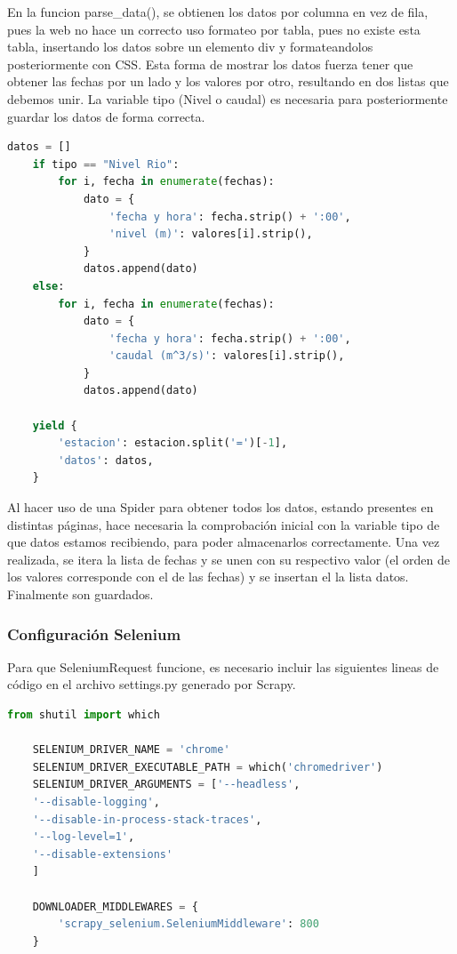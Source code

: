 En la funcion parse\_data(), se obtienen los datos por columna en vez de fila, pues la web no hace un correcto uso formateo por tabla, pues no existe esta tabla, insertando los datos sobre un elemento div y formateandolos posteriormente con CSS. Esta forma de mostrar los datos fuerza tener que obtener las fechas por un lado y los valores por otro, resultando en dos listas que debemos unir. La variable tipo (Nivel o caudal) es necesaria para posteriormente guardar los datos de forma correcta.

\begin{lstlisting}[language=Python, caption={Selector en parse\_data() de Agua en Navarra Data Spider}]
	datos = []
	if tipo == "Nivel Rio":
		for i, fecha in enumerate(fechas):
			dato = {
				'fecha y hora': fecha.strip() + ':00',
				'nivel (m)': valores[i].strip(),
			}
			datos.append(dato)
	else:
		for i, fecha in enumerate(fechas):
			dato = {
				'fecha y hora': fecha.strip() + ':00',
				'caudal (m^3/s)': valores[i].strip(),
			}
			datos.append(dato)
	
	yield {
		'estacion': estacion.split('=')[-1],
		'datos': datos,
	}
\end{lstlisting}

Al hacer uso de una Spider para obtener todos los datos, estando presentes en distintas páginas, hace necesaria la comprobación inicial con la variable tipo de que datos estamos recibiendo, para poder almacenarlos correctamente. Una vez realizada, se itera la lista de fechas y se unen con su respectivo valor (el orden de los valores corresponde con el de las fechas) y se insertan el la lista datos. Finalmente son guardados.

\subsubsection{Configuración Selenium}
Para que SeleniumRequest funcione, es necesario incluir las siguientes lineas de código en el archivo settings.py generado por Scrapy.

\begin{lstlisting}[language=Python, caption={Agua en Navarra configuración Selenium}]
	from shutil import which
	
	SELENIUM_DRIVER_NAME = 'chrome'
	SELENIUM_DRIVER_EXECUTABLE_PATH = which('chromedriver')
	SELENIUM_DRIVER_ARGUMENTS = ['--headless',
	'--disable-logging',
	'--disable-in-process-stack-traces',
	'--log-level=1',
	'--disable-extensions'
	]
	
	DOWNLOADER_MIDDLEWARES = {
		'scrapy_selenium.SeleniumMiddleware': 800
	}
\end{lstlisting}

